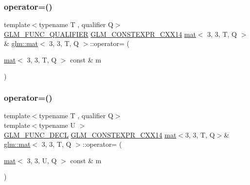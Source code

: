 \subsubsection{\texorpdfstring{operator=()}{operator=()}\hspace{0.1cm}{\footnotesize\ttfamily [1/3]}}
{\footnotesize\ttfamily template$<$typename T , qualifier Q$>$ \\
\hyperlink{setup_8hpp_a33fdea6f91c5f834105f7415e2a64407}{G\+L\+M\+\_\+\+F\+U\+N\+C\+\_\+\+Q\+U\+A\+L\+I\+F\+I\+ER} \hyperlink{setup_8hpp_a4dd12abf5e1164bc57f3a34671d03844}{G\+L\+M\+\_\+\+C\+O\+N\+S\+T\+E\+X\+P\+R\+\_\+\+C\+X\+X14} \hyperlink{structglm_1_1mat}{mat}$<$ 3, 3, T, Q $>$ \& \hyperlink{structglm_1_1mat}{glm\+::mat}$<$ 3, 3, T, Q $>$\+::operator= (\begin{DoxyParamCaption}\item[{\hyperlink{structglm_1_1mat}{mat}$<$ 3, 3, T, Q $>$ const \&}]{m }\end{DoxyParamCaption})}

\mbox{\label{structglm_1_1mat_3_013_00_013_00_01_t_00_01_q_01_4_a53aae107d0de9b06cf3def3d0645883f}} 
\subsubsection{\texorpdfstring{operator=()}{operator=()}\hspace{0.1cm}{\footnotesize\ttfamily [2/3]}}
{\footnotesize\ttfamily template$<$typename T , qualifier Q$>$ \\
template$<$typename U $>$ \\
\hyperlink{setup_8hpp_ab2d052de21a70539923e9bcbf6e83a51}{G\+L\+M\+\_\+\+F\+U\+N\+C\+\_\+\+D\+E\+CL} \hyperlink{setup_8hpp_a4dd12abf5e1164bc57f3a34671d03844}{G\+L\+M\+\_\+\+C\+O\+N\+S\+T\+E\+X\+P\+R\+\_\+\+C\+X\+X14} \hyperlink{structglm_1_1mat}{mat}$<$3, 3, T, Q$>$\& \hyperlink{structglm_1_1mat}{glm\+::mat}$<$ 3, 3, T, Q $>$\+::operator= (\begin{DoxyParamCaption}\item[{\hyperlink{structglm_1_1mat}{mat}$<$ 3, 3, U, Q $>$ const \&}]{m }\end{DoxyParamCaption})}

\mbox{\label{structglm_1_1mat_3_013_00_013_00_01_t_00_01_q_01_4_aec5bce9abbb6bbe0b55fbec3b8c01098}} 
